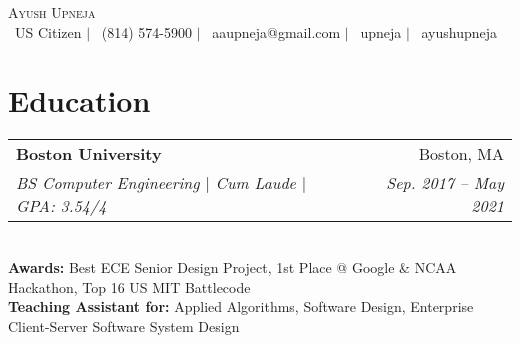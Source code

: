 \documentclass[letterpaper,11pt]{article}
\makeatletter
\newcommand{\resumeItem}[2]{
  \item[]\small{
    \textbf{#1}{#2\vspace{-2pt}}
  }
}
\newcommand{\resumeSubheading}[4]{
  \vspace{-1pt}\item[]
    \begin{tabular*}{0.97\textwidth}{l@{\extracolsep{\fill}}r}
      \textbf{#1} & #2 \\
      \textit{\small#3} & \textit{\small #4} \\
    \end{tabular*}\vspace{-5pt}
}
\newcommand{\resumeItemListStart}{\begin{itemize}[leftmargin=*]}
\newcommand{\resumeItemListEnd}{\end{itemize}\vspace{-5pt}}
\makeatother
\begin{document}

\vspace*{-10pt}
\begin{center}
	{\Huge \scshape {Ayush Upneja}}\\
    \faGlobe \ US Citizen $|$ \faPhone \ (814) 574-5900 $|$ \faEnvelope \ aaupneja@gmail.com $|$ \faLinkedinSquare \ upneja $|$ \faGithub \ ayushupneja \\
\end{center}
\vspace{-8mm}
\section{Education}

    \resumeSubheading
      {Boston University}{Boston, MA}
      {BS Computer Engineering $|$ Cum Laude $|$ \textit{GPA: 3.54/4}}{Sep. 2017 --  May 2021} \\
      \vspace{2mm}
      \small \textbf{Awards:} Best ECE Senior Design Project, 1st Place @ Google \& NCAA Hackathon, Top 16 US MIT Battlecode \\
      \small \textbf{Teaching Assistant for:} Applied Algorithms, Software Design, Enterprise Client-Server Software System Design
  \vspace{-2mm}
  
\end{document}
